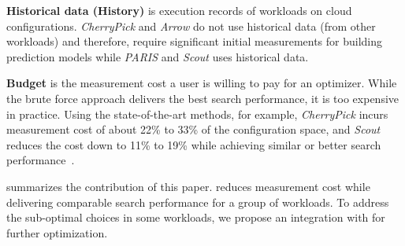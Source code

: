 \textbf{Historical data (History)} is execution records of workloads on cloud configurations.
\emph{CherryPick} and \emph{Arrow} do not use historical data (from other workloads) and therefore, require significant initial measurements for 
building prediction models while
\emph{PARIS} and \emph{Scout} uses historical data.

\textbf{Budget} is the measurement cost a user is willing to pay for an optimizer.
While the brute force approach delivers the best search performance,
it is too expensive in practice.
Using the state-of-the-art methods, for example,
\emph{CherryPick} incurs measurement cost of about 22\% to 33\% of the configuration space, and
\emph{Scout} reduces the cost down to 11\% to 19\% while achieving similar or better search performance~\cite{Hsu2018Scout}.

\myfigure{\ref{fig:practical_guide}} summarizes the contribution of this paper.
\micky reduces measurement cost while delivering comparable search performance for a group of workloads.
To address the sub-optimal choices in some workloads, we propose an integration with \scout for further optimization.
